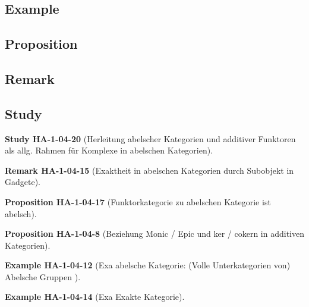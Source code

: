 \documentclass[10pt, letterpaper]{article}
\newcommand{\CustomHeading}[3]{%
  \par\medskip\noindent%
  \textbf{#1 #2} \textnormal{(#3)}.\enskip%
}
\newenvironment{PROP}[2]{\CustomHeading{Proposition}{#1}{#2}}{}
\newenvironment{REM}[2]{\CustomHeading{Remark}{#1}{#2}}{}
\newenvironment{EXA}[2]{\CustomHeading{Example}{#1}{#2}}{}
\newenvironment{STUD}[2]{\CustomHeading{Study}{#1}{#2}}{}
\begin{document}
\subsection{Example}

\subsection{Proposition}

\subsection{Remark}

\subsection{Study}



\begin{STUD}{HA-1-04-20}{Herleitung abelscher Kategorien und additiver Funktoren als allg. Rahmen für Komplexe in abelschen Kategorien}

\end{STUD}





\begin{REM}{HA-1-04-15}{Exaktheit in abelschen Kategorien durch Subobjekt in Gadgete}

\end{REM}





\begin{PROP}{HA-1-04-17}{Funktorkategorie zu abelschen Kategorie ist abelsch}

\end{PROP}

\begin{PROP}{HA-1-04-8}{Beziehung Monic / Epic und ker / cokern in additiven Kategorien}

\end{PROP}







\begin{EXA}{HA-1-04-12}{Exa abelsche Kategorie: (Volle Unterkategorien von) Abelsche Gruppen }

\end{EXA}

\begin{EXA}{HA-1-04-14}{Exa Exakte Kategorie}

\end{EXA}
\end{document}
